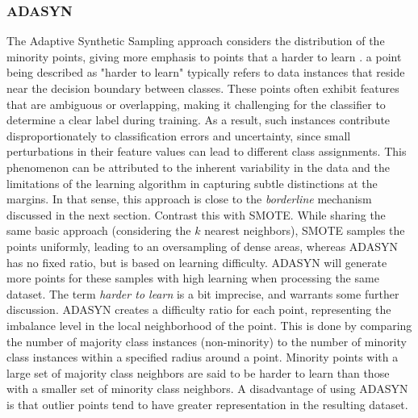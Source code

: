 \documentclass[letterpaper, notitlepage]{report}
\begin{document}
\subsubsection{ADASYN}
\label{section:adasyn}
The Adaptive Synthetic Sampling approach considers the distribution of the minority points, giving more emphasis to points that a harder to learn \parencite{He2008-xr}. a point being described as "harder to learn" typically refers to data instances that reside near the decision boundary between classes. These points often exhibit features that are ambiguous or overlapping, making it challenging for the classifier to determine a clear label during training. As a result, such instances contribute disproportionately to classification errors and uncertainty, since small perturbations in their feature values can lead to different class assignments. This phenomenon can be attributed to the inherent variability in the data and the limitations of the learning algorithm in capturing subtle distinctions at the margins. In that sense, this approach is close to the \textit{borderline} mechanism discussed in the next section. Contrast this with SMOTE. While sharing the same basic approach (considering the $k$ nearest neighbors), SMOTE samples the points uniformly, leading to an oversampling of dense areas, whereas ADASYN has no fixed ratio, but is based on learning difficulty. ADASYN will generate more points for these samples with high learning when processing the same dataset. The term \textit{harder to learn} is a bit imprecise, and warrants some further discussion. ADASYN creates a difficulty ratio for each point, representing the imbalance level in the local neighborhood of the point. This is done by comparing the number of majority class instances (non-minority) to the number of minority class instances within a specified radius around a point. Minority points with a large set of majority class neighbors are said to be harder to learn than those with a smaller set of minority class neighbors. A disadvantage of using ADASYN is that outlier points tend to have greater representation in the resulting dataset.
\end{document}

